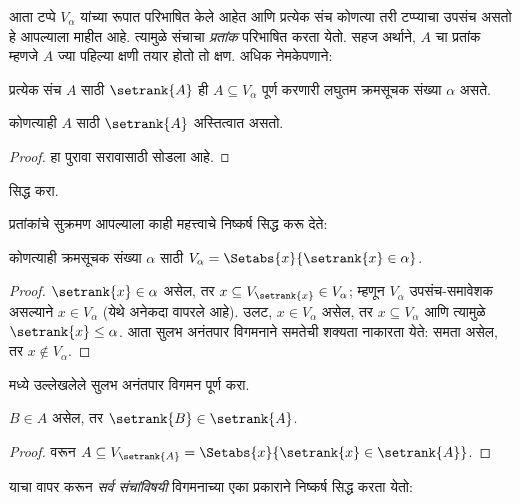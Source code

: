 \documentclass[../../../include/open-logic-section]{subfiles}
\begin{document}

आता टप्पे $V_\alpha$ यांच्या रूपात परिभाषित केले आहेत आणि प्रत्येक संच कोणत्या तरी टप्प्याचा उपसंच असतो हे आपल्याला माहीत आहे. त्यामुळे संचाचा \emph{प्रतांक} परिभाषित करता येतो. सहज अर्थाने, $A$ चा प्रतांक म्हणजे $A$ ज्या पहिल्या क्षणी तयार होतो तो क्षण. अधिक नेमकेपणाने:

\begin{defn}
प्रत्येक संच $A$ साठी $\setrank{A}$ ही $A
\subseteq V_\alpha$ पूर्ण करणारी लघुतम क्रमसूचक संख्या $\alpha$ असते.
\end{defn}
\begin{prop}
	कोणत्याही $A$ साठी $\setrank{A}$ अस्तित्वात असतो.
\end{prop}
\begin{proof}
	हा पुरावा सरावासाठी सोडला आहे.
\end{proof}
\begin{prob}
	 सिद्ध करा.
\end{prob}
\noindent
प्रतांकांचे सुक्रमण आपल्याला काही महत्त्वाचे निष्कर्ष सिद्ध करू देते:
\begin{prop}
कोणत्याही क्रमसूचक संख्या $\alpha$ साठी $V_\alpha = \Setabs{x}{\setrank{x} \in \alpha}$.
\end{prop}

\begin{proof}
$\setrank{x} \in \alpha$ असेल, तर $x \subseteq V_{\setrank{x}} \in
V_\alpha$; म्हणून $V_\alpha$ उपसंच-समावेशक असल्याने $x \in V_\alpha$ (येथे  अनेकदा वापरले आहे). उलट, $x \in V_\alpha$ असेल, तर $x \subseteq V_\alpha$ आणि त्यामुळे $\setrank{x} \leq \alpha$. आता सुलभ अनंतपार विगमनाने समतेची शक्यता नाकारता येते: समता असेल, तर $x \notin V_\alpha$.
\end{proof}
\begin{prob}
	 मध्ये उल्लेखलेले सुलभ अनंतपार विगमन पूर्ण करा.
\end{prob}

\begin{prop}
$B \in A$ असेल, तर $\setrank{B} \in \setrank{A}$.
\end{prop}

\begin{proof}
 वरून $A \subseteq V_{\setrank{A}} = \Setabs{x}{\setrank{x} \in
\setrank{A}}$.
\end{proof}
\noindent
याचा वापर करून \emph{सर्व संचांविषयी} विगमनाच्या एका प्रकाराने निष्कर्ष सिद्ध करता येतो:
\end{document}
